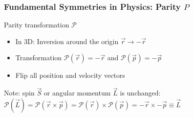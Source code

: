 \begin{frame}[t]
 \frametitle{Fundamental Symmetries in Physics: Parity $P$}
 \begin{block}{Parity transformation $\mathcal{P}$}
  \begin{itemize}
   \item In 3D: \alert{Inversion around the origin} $\vec{r} \rightarrow -\vec{r}$
   \item Transformation $\mathcal{P}(\vec{r}) = -\vec{r}$ and $\mathcal{P}(\vec{p}) = -\vec{p}$
   \item Flip all position and velocity vectors
  \end{itemize}
 \end{block}
 \begin{center}
 \end{center}
 Note: spin $\vec{S}$ or angular momentum $\vec{L}$ is unchanged:
 $\mathcal{P}(\vec{L}) = \mathcal{P}(\vec{r} \times \vec{p}) = \mathcal{P}(\vec{r}) \times \mathcal{P}(\vec{p}) = -\vec{r} \times -\vec{p} \equiv \vec{L}$
\end{frame}
